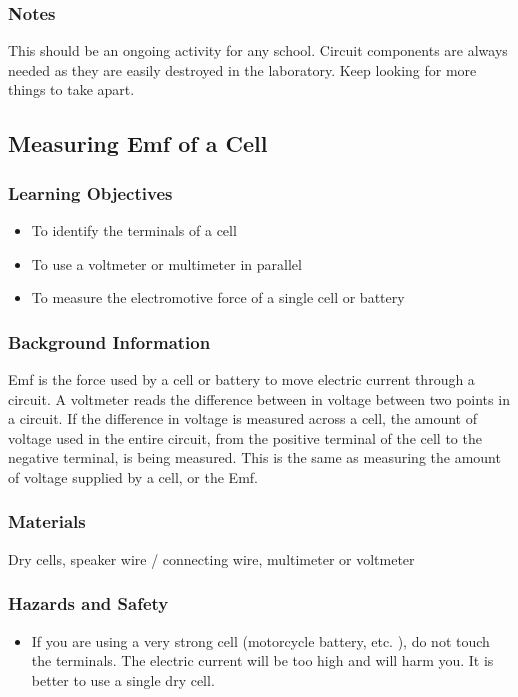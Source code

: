 \subsubsection*{Notes}
This should be an ongoing activity for any school. Circuit components are always needed as they are easily destroyed in the laboratory. Keep looking for more things to take apart. 

\subsection{Measuring Emf of a Cell}

\subsubsection*{Learning Objectives}
\begin{itemize}
\item{To identify the terminals of a cell} 
\item{To use a voltmeter or multimeter in parallel} 
\item{To measure the electromotive force of a single cell or battery} 
\end{itemize}

\subsubsection*{Background Information}
Emf is the force used by a cell or battery to move electric current through a circuit. A voltmeter reads the difference between in voltage between two points in a circuit. If the difference in voltage is measured across a cell, the amount of voltage used in the entire circuit, from the positive terminal of the cell to the negative terminal, is being measured. This is the same as measuring the amount of voltage supplied by a cell, or the Emf. 

\subsubsection*{Materials}
Dry cells, speaker wire / connecting wire, multimeter or voltmeter

\subsubsection*{Hazards and Safety}
\begin{itemize}
\item{If you are using a very strong cell (motorcycle battery, etc. ), do not touch the terminals. The electric current will be too high and will harm you. It is better to use a single dry cell.} 
\end{itemize}

